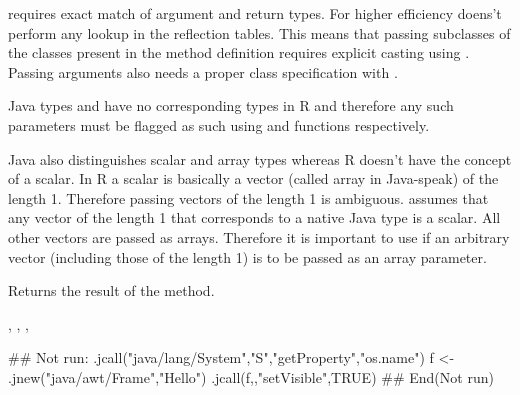 \begin{Details}\relax
{} requires exact match of argument and return types. For
higher efficiency  doens't perform any lookup in the
reflection tables. This means that passing subclasses of the classes
present in the method definition requires explicit casting using
. Passing  arguments also needs a
proper class specification with .

Java types  and  have no corresponding types in
R and therefore any such parameters must be flagged as such using
 and  functions respectively.

Java also distinguishes scalar and array types whereas R doesn't have
the concept of a scalar. In R a scalar is basically a vector (called
array in Java-speak) of the length 1. Therefore passing vectors of the
length 1 is ambiguous.  assumes that any vector of the
length 1 that corresponds to a native Java type is a scalar. All other
vectors are passed as arrays. Therefore it is important to use
 if an arbitrary vector (including those of the
length 1) is to be passed as an array parameter.
\end{Details}
\begin{Value}
Returns the result of the method.
\end{Value}
\begin{SeeAlso}\relax
{}, , ,
\end{SeeAlso}
\begin{Examples}
\begin{ExampleCode}
## Not run: 
.jcall("java/lang/System","S","getProperty","os.name")
f <- .jnew("java/awt/Frame","Hello")
.jcall(f,,"setVisible",TRUE)
## End(Not run)
\end{ExampleCode}
\end{Examples}


